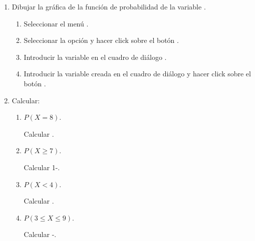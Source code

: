 \begin{enumerate}[leftmargin=*]
\begin{enumerate}
\begin{indicacion}
\begin{enumerate}
\end{enumerate}
\end{indicacion}

\item Dibujar la gráfica de la función de probabilidad de la
variable .

\begin{indicacion}
\begin{enumerate}

\item Seleccionar el menú .

\item Seleccionar la opción  y hacer click sobre el
botón .

\item Introducir la variable  en el cuadro de diálogo
.

\item Introducir la variable creada  en el
cuadro de diálogo  y hacer click sobre el botón
.

\end{enumerate}
\end{indicacion}
\item Calcular:

\begin{enumerate}

\item $P(X=8)$.

\begin{indicacion}
Calcular .
\end{indicacion}


\item $P(X\geq 7)$.

\begin{indicacion}
Calcular 1-.
\end{indicacion}

\item $P(X< 4)$.

\begin{indicacion}
Calcular .
\end{indicacion}

\item $P(3\leq X \leq  9)$.

\begin{indicacion}
Calcular
-.
\end{indicacion}


\end{enumerate}
\end{enumerate}
\end{enumerate}
